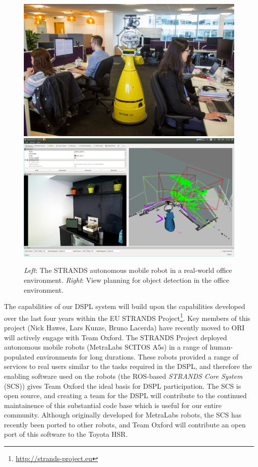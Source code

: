 \documentclass[runningheads,a4paper]{llncs}
\newcommand{\teamori}{Team Oxford}
\begin{document}
\begin{figure}[tb]
  \begin{center}
    \includegraphics[width=.43\columnwidth]{images/betty.jpg}
    \includegraphics[width=.55\columnwidth,clip,trim=10ex 20ex 10ex 20ex]{images/viewplanning_at_tsc.png}
  \end{center}   
  \caption{\textit{Left}: The STRANDS autonomous mobile robot in a real-world
  office environment. \textit{Right}: View planning for object detection in the
  office environment.}
  \label{fig:mk}
  \vspace{-3ex}
\end{figure}

The capabilities of our DSPL system will build upon the capabilities developed over the last four years within the EU STRANDS Project\footnote{\url{http://strands-project.eu}}. Key members of this project (Nick Hawes, Lars Kunze, Bruno Lacerda) have recently moved to ORI will actively engage with \teamori. The STRANDS Project deployed autonomous mobile robots (MetraLabs SCITOS A5s) in a range of human-populated environments for long durations\cite{strands@ram}. These robots provided a range of services to real users similar to the tasks required in the DSPL, and therefore the enabling software used on the robots (the ROS-based \emph{STRANDS Core System} (SCS)) gives \teamori{} the ideal basis for DSPL participation. The SCS is open source, and creating a team for the DSPL will contribute to the continued maintainence of this substantial code base which is useful for our entire community. Although originally developed for MetraLabs robots, the SCS has recently been ported to other robots, and \teamori{} will contribute an open port of this software to the Toyota HSR. 
\end{document}
